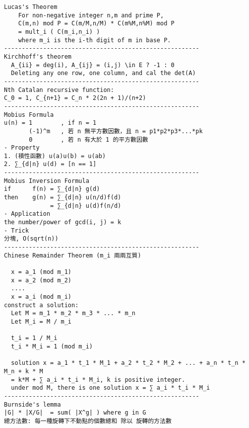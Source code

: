 \begin{verbatim}
Lucas's Theorem
    For non-negative integer n,m and prime P,
    C(m,n) mod P = C(m/M,n/M) * C(m%M,n%M) mod P
    = mult_i ( C(m_i,n_i) )
    where m_i is the i-th digit of m in base P.
-------------------------------------------------------
Kirchhoff's theorem
  A_{ii} = deg(i), A_{ij} = (i,j) \in E ? -1 : 0
  Deleting any one row, one column, and cal the det(A)
-------------------------------------------------------
Nth Catalan recursive function:
C_0 = 1, C_{n+1} = C_n * 2(2n + 1)/(n+2)
-------------------------------------------------------
Mobius Formula
u(n) = 1        , if n = 1
       (-1)^m   , 若 n 無平方數因數，且 n = p1*p2*p3*...*pk
       0        , 若 n 有大於 1 的平方數因數
- Property
1. (積性函數) u(a)u(b) = u(ab)
2. ∑_{d|n} u(d) = [n == 1]
-------------------------------------------------------
Mobius Inversion Formula
if      f(n) = ∑_{d|n} g(d)
then    g(n) = ∑_{d|n} u(n/d)f(d)
             = ∑_{d|n} u(d)f(n/d)
- Application
the number/power of gcd(i, j) = k
- Trick
分塊, O(sqrt(n))
-------------------------------------------------------
Chinese Remainder Theorem (m_i 兩兩互質)

  x = a_1 (mod m_1)
  x = a_2 (mod m_2)
  ....
  x = a_i (mod m_i)
construct a solution:
  Let M = m_1 * m_2 * m_3 * ... * m_n
  Let M_i = M / m_i

  t_i = 1 / M_i
  t_i * M_i = 1 (mod m_i)

  solution x = a_1 * t_1 * M_1 + a_2 * t_2 * M_2 + ... + a_n * t_n * M_n + k * M
  = k*M + ∑ a_i * t_i * M_i, k is positive integer.
  under mod M, there is one solution x = ∑ a_i * t_i * M_i
-------------------------------------------------------
Burnside's lemma
|G| * |X/G|  = sum( |X^g| ) where g in G
總方法數: 每一種旋轉下不動點的個數總和 除以 旋轉的方法數
\end{verbatim}